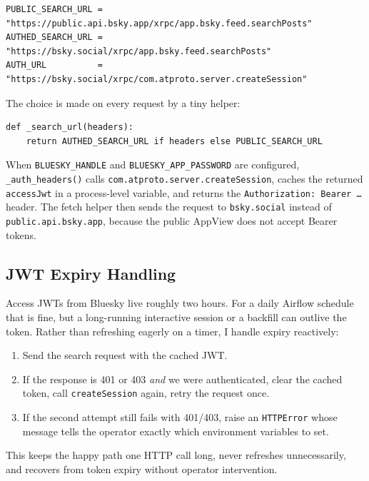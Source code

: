 \documentclass[11pt]{article}
\begin{document}
\begin{lstlisting}
PUBLIC_SEARCH_URL = "https://public.api.bsky.app/xrpc/app.bsky.feed.searchPosts"
AUTHED_SEARCH_URL = "https://bsky.social/xrpc/app.bsky.feed.searchPosts"
AUTH_URL          = "https://bsky.social/xrpc/com.atproto.server.createSession"
\end{lstlisting}

The choice is made on every request by a tiny helper:

\begin{lstlisting}
def _search_url(headers):
    return AUTHED_SEARCH_URL if headers else PUBLIC_SEARCH_URL
\end{lstlisting}

When \texttt{BLUESKY\_HANDLE} and \texttt{BLUESKY\_APP\_PASSWORD} are
configured, \texttt{\_auth\_headers()} calls
\texttt{com.atproto.server.createSession}, caches the returned
\texttt{accessJwt} in a process-level variable, and returns the
\texttt{Authorization: Bearer \ldots} header. The fetch helper then sends
the request to \texttt{bsky.social} instead of
\texttt{public.api.bsky.app}, because the public AppView does not accept
Bearer tokens.

\subsection{JWT Expiry Handling}

Access JWTs from Bluesky live roughly two hours. For a daily Airflow
schedule that is fine, but a long-running interactive session or a
backfill can outlive the token. Rather than refreshing eagerly on a
timer, I handle expiry reactively:

\begin{enumerate}[leftmargin=*]
  \item Send the search request with the cached JWT.
  \item If the response is 401 or 403 \emph{and} we were authenticated,
        clear the cached token, call \texttt{createSession} again, retry
        the request once.
  \item If the second attempt still fails with 401/403, raise an
        \texttt{HTTPError} whose message tells the operator exactly which
        environment variables to set.
\end{enumerate}

This keeps the happy path one HTTP call long, never refreshes
unnecessarily, and recovers from token expiry without operator
intervention.
\end{document}

